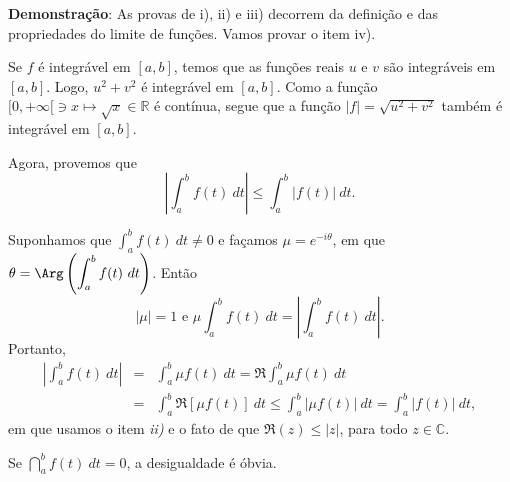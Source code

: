 \textbf{Demonstração}: As provas de i), ii) e iii) decorrem da definição e das propriedades do limite de funções. Vamos provar o item iv).


Se $f$ é integrável em $[a, b]$, temos que as funções reais $u$ e $v$ são integráveis em $[a, b]$. Logo, $u^2+v^2$ é integrável em $[a, b]$. Como a função $[0, +\infty[ \ni x \mapsto \sqrt{x} \in \mathbb{R}$ é contínua, segue que a função $|f|=\sqrt{u^2+v^2}$ também é integrável em $[a, b]$.

Agora, provemos que
$$\displaystyle \left|\int_{a}^{b} f(t)~dt \right| \leq \displaystyle\int_{a}^{b} |f(t)|~dt.$$


Suponhamos que $\displaystyle\int_{a}^{b} f(t)~dt \neq 0$ e façamos $\mu = e^{-i \theta}$, em que $\theta = \Arg\left(\displaystyle\int_{a}^{b} f(t)~dt\right)$. Então
$$|\mu| = 1 \mbox{ e } \mu \displaystyle\int_{a}^{b} f(t)~dt = \displaystyle \left|\int_{a}^{b} f(t)~dt \right|.$$
Portanto,
\begin{eqnarray*}
\displaystyle \left|\int_{a}^{b} f(t)~dt \right|
&=& \displaystyle\int_{a}^{b} \mu f(t)~dt = \Re \displaystyle\int_{a}^{b} \mu f(t)~dt \\
&=& \displaystyle\int_{a}^{b} \Re [\mu f(t)]~dt \leq \displaystyle\int_{a}^{b} |\mu f(t)|~dt = \displaystyle\int_{a}^{b} |f(t)|~dt,
\end{eqnarray*}
em que usamos o item \textit{ii)} e o fato de que $\Re(z) \leq |z|$, para todo $z \in \mathbb{C}$.


Se $\dint_{a}^{b} f(t)~dt = 0$, a desigualdade é óbvia.





